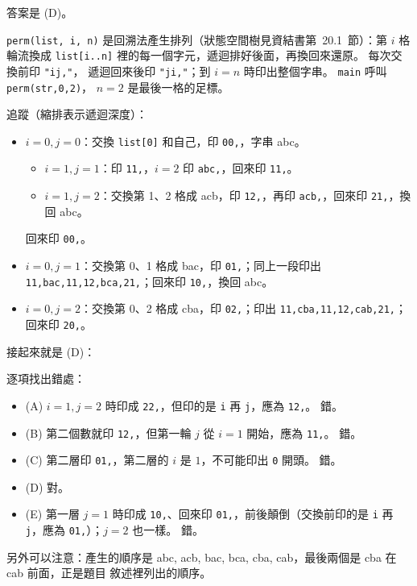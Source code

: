 \begin{pastsoln}
答案是 (D)。

\texttt{perm(list, i, n)} 是回溯法產生排列（狀態空間樹見資結書第~20.1~節）：第 $i$ 格輪流換成
\texttt{list[i..n]} 裡的每一個字元，遞迴排好後面，再換回來還原。 每次交換前印 \texttt{"ij,"}，
遞迴回來後印 \texttt{"ji,"}；到 $i = n$ 時印出整個字串。 \texttt{main} 呼叫 \texttt{perm(str,0,2)}，
$n = 2$ 是最後一格的足標。

追蹤（縮排表示遞迴深度）：
\begin{itemize}
\item $i = 0, j = 0$：交換 \texttt{list[0]} 和自己，印 \texttt{00,}，字串 abc。
  \begin{itemize}
  \item $i = 1, j = 1$：印 \texttt{11,}，$i = 2$ 印 \texttt{abc,}，回來印 \texttt{11,}。
  \item $i = 1, j = 2$：交換第 1、2 格成 acb，印 \texttt{12,}，再印 \texttt{acb,}，回來印
  \texttt{21,}，換回 abc。
  \end{itemize}
  回來印 \texttt{00,}。
\item $i = 0, j = 1$：交換第 0、1 格成 bac，印 \texttt{01,}；同上一段印出
\texttt{11,bac,11,12,bca,21,}；回來印 \texttt{10,}，換回 abc。
\item $i = 0, j = 2$：交換第 0、2 格成 cba，印 \texttt{02,}；印出 \texttt{11,cba,11,12,cab,21,}；
回來印 \texttt{20,}。
\end{itemize}
接起來就是 (D)：


逐項找出錯處：
\begin{itemize}
\item (A) $i = 1, j = 2$ 時印成 \texttt{22,}，但印的是 \texttt{i} 再 \texttt{j}，應為 \texttt{12,}。 錯。
\item (B) 第二個數就印 \texttt{12,}，但第一輪 $j$ 從 $i = 1$ 開始，應為 \texttt{11,}。 錯。
\item (C) 第二層印 \texttt{01,}，第二層的 $i$ 是 $1$，不可能印出 \texttt{0} 開頭。 錯。
\item (D) 對。
\item (E) 第一層 $j = 1$ 時印成 \texttt{10,}、回來印 \texttt{01,}，前後顛倒（交換前印的是
\texttt{i} 再 \texttt{j}，應為 \texttt{01,}）；$j = 2$ 也一樣。 錯。
\end{itemize}
另外可以注意：產生的順序是 abc, acb, bac, bca, cba, cab，最後兩個是 cba 在 cab 前面，正是題目
敘述裡列出的順序。
\end{pastsoln}
